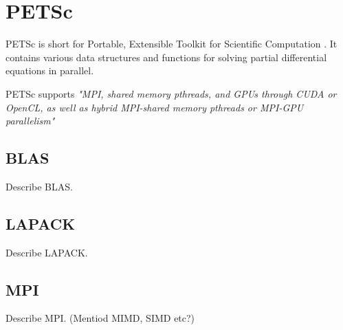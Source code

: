 \section{PETSc}

PETSc is short for Portable, Extensible Toolkit for Scientific Computation 
\cite{PETScWebpage}. It contains various data structures and functions for 
solving partial differential equations in parallel. 

PETSc supports \emph{"MPI, shared memory pthreads, and GPUs through CUDA or OpenCL, as 
well as hybrid MPI-shared memory pthreads or MPI-GPU parallelism"}\cite{PETScWebpage}

\subsection{BLAS}

Describe BLAS.

\subsection{LAPACK}

Describe LAPACK.

\subsection{MPI}

Describe MPI. (Mentiod MIMD, SIMD etc?)

